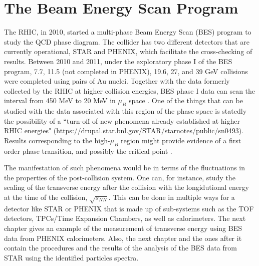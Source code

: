 \section{The Beam Energy Scan Program}
The RHIC, in 2010, started a multi-phase Beam Energy Scan (BES) program to study the QCD phase diagram. The collider has two different detectors that are currently operational, STAR and PHENIX, which facilitate the cross-checking of results. Between 2010 and 2011, under the exploratory phase I of the BES program, 7.7, 11.5 (not completed in PHENIX), 19.6, 27, and 39 GeV collisions were completed using pairs of Au nuclei. Together with the data formerly collected by the RHIC at higher collision energies, BES phase I data can scan the interval from 450 MeV to 20 MeV in $\mu_{B}$ space \cite{1742-6596-455-1-012037, LUO201675}. One of the things that can be studied with the data associated with this region of the phase space is statedly the possibility of a ``turn-off of new phenomena already established at higher RHIC energies" (https://drupal.star.bnl.gov/STAR/starnotes/public/sn0493). Results corresponding to the high-$\mu_{B}$ region might provide evidence of a first order phase transition, and possibly the critical point \cite{LUO201675}.

The manifestation of such phenomena would be in terms of the fluctuations in the properties of the post-collision system. One can, for instance, study the scaling of the transverse energy after the collision with the longidutional energy at the time of the collision, $\sqrt{s_{NN}}$. This can be done in multiple ways for a detector like STAR or PHENIX that is made up of sub-systems such as the TOF detectors, TPCs/Time Expansion Chambers, as well as calorimeters. The next chapter gives an example of the measurement of transverse energy using BES data from PHENIX calorimeters. Also, the next chapter and the ones after it contain the procedures and the results of the analysis of the BES data from STAR using the identified particles spectra.

